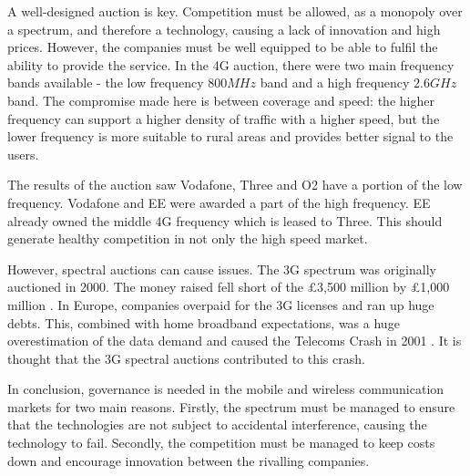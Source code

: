 A well-designed auction is key. 
Competition must be allowed, as a monopoly over a spectrum, and therefore a technology, causing a lack of innovation and high prices. 
However, the companies must be well equipped to be able to fulfil the ability to provide the service.
In the 4G auction, there were two main frequency bands available - the low frequency $800MHz$ band and a high frequency $2.6GHz$ band. 
The compromise made here is between coverage and speed: the higher frequency can support a higher density of traffic with a higher speed, but the lower frequency is more suitable to rural areas and provides better signal to the users.

The results of the auction saw Vodafone, Three and O2 have a portion of the low frequency. 
Vodafone and EE were awarded a part of the high frequency.
EE already owned the middle 4G frequency which is leased to Three. 
This should generate healthy competition in not only the high speed market. 

However, spectral auctions can cause issues.
The 3G spectrum was originally auctioned in 2000. 
The money raised fell short of the \pounds 3,500 million by \pounds 1,000 million \cite{telecom}.
In Europe, companies overpaid for the 3G licenses and ran up huge debts.
This, combined with home broadband expectations, was a huge overestimation of the data demand and caused the Telecoms Crash in 2001 \cite{telecom:crash}.
It is thought that the 3G spectral auctions contributed to this crash.

In conclusion, governance is needed in the mobile and wireless communication markets for two main reasons.
Firstly, the spectrum must be managed to ensure that the technologies are not subject to accidental interference, causing the technology to fail. 
Secondly, the competition must be managed to keep costs down and encourage innovation between the rivalling companies. 


